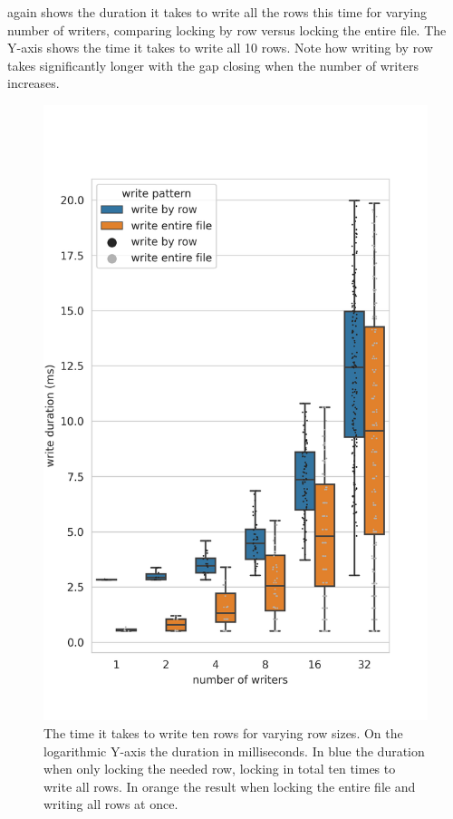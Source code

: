  again shows the duration it takes to write all the rows this time for varying number of writers, comparing locking by row versus locking the entire file. The Y-axis shows the time it takes to write all 10 rows. Note how writing by row takes significantly longer with the gap closing when the number of writers increases.
%
\begin{figure}[htbp]
	\centering
	\includegraphics[height=\textheight]{../results/plots/range_vs_writers_both.png}
	\caption{The time it takes to write ten rows for varying row sizes. On the logarithmic Y-axis the duration in milliseconds. In blue the duration when only locking the needed row, locking in total ten times to write all rows. In orange the result when locking the entire file and writing all rows at once.}
	\label{fig:writers}
\end{figure}

\clearpage

